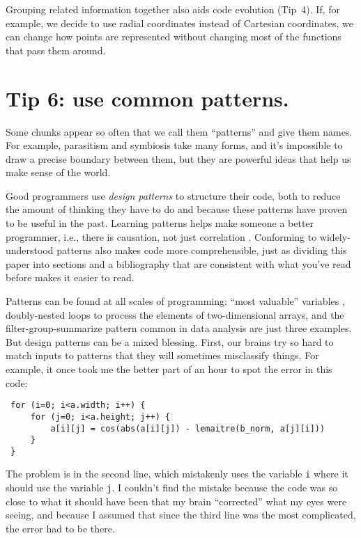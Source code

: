 \documentclass[10pt,letterpaper]{article}
\begin{document}
Grouping related information together also aids code evolution (Tip~4).
If, for example, we decide to use radial coordinates instead of Cartesian coordinates,
we can change how points are represented without changing most of the functions that pass them around.

\section*{Tip 6: use common patterns.}

Some chunks appear so often that we call them ``patterns'' and give them names.
For example,
parasitism and symbiosis take many forms,
and it's impossible to draw a precise boundary between them,
but they are powerful ideas that help us make sense of the world.

Good programmers use \emph{design patterns} to structure their code,
both to reduce the amount of thinking they have to do
and because these patterns have proven to be useful in the past.
Learning patterns helps make someone a better programmer,
i.e.,
there is causation, not just correlation \cite{Tichy2010}.
Conforming to widely-understood patterns also makes code more comprehensible,
just as dividing this paper into sections and a bibliography
that are consistent with what you've read before
makes it easier to read.

Patterns can be found at all scales of programming:
``most valuable'' variables \cite{Byckling2005},
doubly-nested loops to process the elements of two-dimensional arrays,
and the filter-group-summarize pattern common in data analysis
are just three examples.
But design patterns can be a mixed blessing.
First,
our brains try so hard to match inputs to patterns that they will sometimes misclassify things.
For example,
it once took me the better part of an hour to spot the error in this code:

\begin{lstlisting}
 for (i=0; i<a.width; i++) {
     for (j=0; i<a.height; j++) {
         a[i][j] = cos(abs(a[i][j]) - lemaitre(b_norm, a[j][i]))
     }
 }
\end{lstlisting}

The problem is in the second line,
which mistakenly uses the variable \texttt{i} where it should use the variable \texttt{j}.
I couldn't find the mistake because
the code was so close to what it should have been that my brain ``corrected'' what my eyes were seeing,
and because I assumed that since the third line was the most complicated,
the error had to be there.
\end{document}
